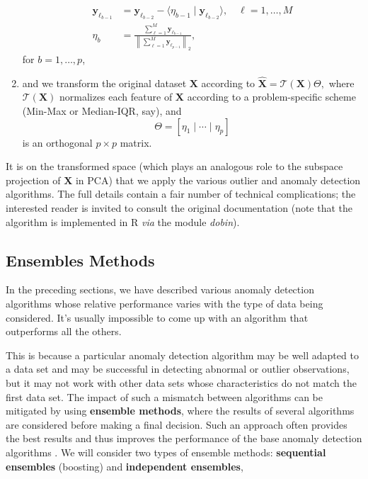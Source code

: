 \begin{enumerate}[noitemsep]
\begin{align*}
\mathbf{y}_{\ell_{b-1}}&=\mathbf{y}_{\ell_{b-2}}-\langle\eta_{b-1} \mid \mathbf{y}_{\ell_{b-2}}\rangle,\quad \ell=1,\ldots, M \\ 
\eta_b&=\frac{\sum_{\ell=1}^M\mathbf{y}_{\ell_{b-1}}}{\left\|\sum_{\ell=1}^M\mathbf{y}_{\ell_{p-1}}\right\|_2},
\end{align*} for $b=1,\ldots,p$,
\item and we transform the original dataset   $\mathbf{X}$ according to  $\hat{\mathbf{X}}=\mathcal{T}(\mathbf{X})\Theta,$ where $\mathcal{T}(\mathbf{X})$ normalizes each feature of  $\mathbf{X}$ according to a problem-specific scheme  (Min-Max or Median-IQR, say), and $$\Theta=[\eta_1\mid\cdots\mid \eta_p]$$ is an orthogonal $p\times p$ matrix.  
\end{enumerate}
It is on the transformed space (which plays an analogous role to the subspace projection of  $\mathbf{X}$ in PCA) that we apply the various outlier and anomaly detection algorithms.\newl 
The full details contain a fair number of technical complications; the interested reader is invited to consult the original documentation \cite{A6} (note that the algorithm is implemented in R \textit{via} the module \textit{dobin}). 
%
\subsection{Ensembles Methods}
%
%
In the preceding sections, we have described various anomaly detection algorithms whose relative performance varies with the type of data being considered. It's usually impossible to come up with an algorithm that outperforms all the others. \par This is because a particular anomaly detection algorithm may be well adapted to a data set and may be successful in detecting abnormal or outlier observations, but it may not work with other data sets whose characteristics do not match the first data set. \newl The impact of such a mismatch between algorithms can be mitigated by using  \textbf{ensemble methods}, where the results of several algorithms are considered before making a final decision. Such an approach often provides the best results and thus improves the performance of the base anomaly detection algorithms \cite{A10}. 
\newl We will consider two types of ensemble methods:  \textbf{sequential ensembles} (boosting) and \textbf{independent ensembles}, 
